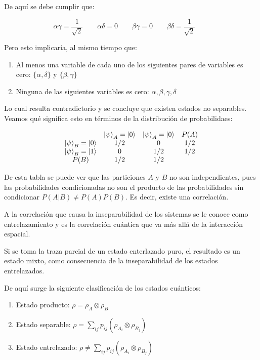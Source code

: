 De aquí se debe cumplir que:

$$
    \alpha \gamma = \frac{1}{\sqrt{2}} \qquad
    \alpha \delta = 0 \qquad
    \beta \gamma = 0 \qquad
    \beta \delta = \frac{1}{\sqrt{2}} \qquad
$$

Pero esto implicaría, al mismo tiempo que:

\begin{enumerate}
    \item Al menos una variable de cada uno de los siguientes pares de variables es cero: $\{\alpha, \delta\}$ y $\{\beta, \gamma\}$
    \item Ninguna de las siguientes variables es cero: $\alpha, \beta, \gamma, \delta$
\end{enumerate}

Lo cual resulta contradictorio y se concluye que existen estados no separables. Veamos qué significa esto en términos de la distribución de probabilidaes:

\[
\begin{array}{c c c c}
    & \ket{\psi}_A = \ket{0} & \ket{\psi}_A = \ket{0} & P(A) \\
    \ket{\psi}_B = \ket{0} & 1/2 & 0 & 1/2 \\
    \ket{\psi}_B = \ket{1} & 0 & 1/2 & 1/2 \\
    P(B) & 1/2 & 1/2 &
\end{array}
\]

De esta tabla se puede ver que las particiones $A$ y $B$ no son independientes, pues las probabilidades condicionadas no son el producto de las probabilidades sin condicionar $P(A|B) \neq P(A)P(B)$. Es decir, existe una correlación.

A la correlación que causa la inseparabilidad de los sistemas se le conoce como entrelazamiento y es la correlación cuántica que va más allá de la interacción espacial.

Si se toma la traza parcial de un estado enterlazado puro, el resultado es un estado mixto, como consecuencia de la inseparabilidad de los estados entrelazados.

De aquí surge la siguiente clasificación de los estados cuánticos:

\begin{enumerate}
    \item Estado producto: $\rho = \rho_A \otimes \rho_B$
    \item Estado separable: $\rho = \sum\limits_{i j} p_{i j} (\rho_{A_i} \otimes \rho_{B_j})$
    \item Estado entrelazado: $\rho \neq \sum\limits_{i j} p_{i j} (\rho_{A_i} \otimes \rho_{B_j})$
\end{enumerate}

